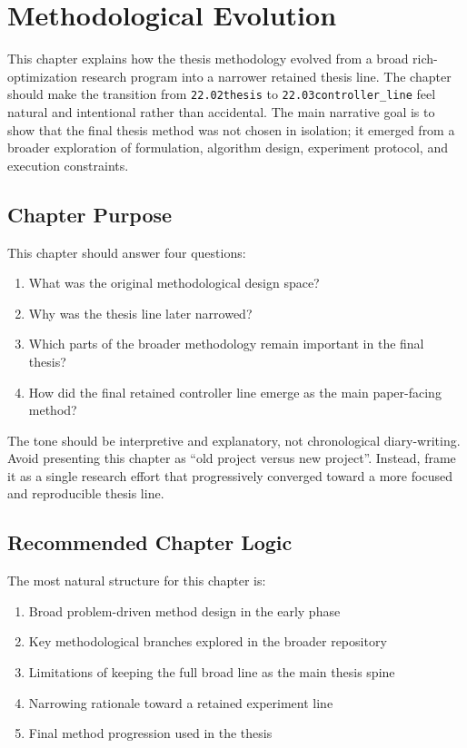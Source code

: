\chapter{Methodological Evolution}
\label{chap:methodological_evolution}

This chapter explains how the thesis methodology evolved from a broad rich-optimization research program into a narrower retained thesis line. The chapter should make the transition from \texttt{22.02thesis} to \texttt{22.03controller_line} feel natural and intentional rather than accidental. The main narrative goal is to show that the final thesis method was not chosen in isolation; it emerged from a broader exploration of formulation, algorithm design, experiment protocol, and execution constraints.

\section{Chapter Purpose}
This chapter should answer four questions:

\begin{enumerate}
    \item What was the original methodological design space?
    \item Why was the thesis line later narrowed?
    \item Which parts of the broader methodology remain important in the final thesis?
    \item How did the final retained controller line emerge as the main paper-facing method?
\end{enumerate}

The tone should be interpretive and explanatory, not chronological diary-writing. Avoid presenting this chapter as ``old project versus new project''. Instead, frame it as a single research effort that progressively converged toward a more focused and reproducible thesis line.

\section{Recommended Chapter Logic}
The most natural structure for this chapter is:

\begin{enumerate}
    \item Broad problem-driven method design in the early phase
    \item Key methodological branches explored in the broader repository
    \item Limitations of keeping the full broad line as the main thesis spine
    \item Narrowing rationale toward a retained experiment line
    \item Final method progression used in the thesis
\end{enumerate}

